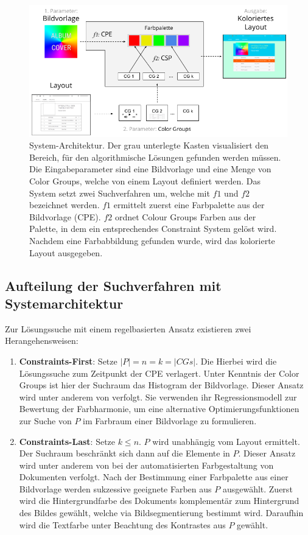 \documentclass[11pt, bibliography=totoc]{scrartcl}
\begin{document}
\begin{figure}
	\centering
	\includegraphics[width=1\textwidth]{img/architecture.png}
	\caption{System-Architektur. Der grau unterlegte Kasten visualisiert den Bereich, für den algorithmische Lösungen gefunden werden müssen. Die Eingabeparameter sind eine Bildvorlage und eine Menge von Color Groups, welche von einem Layout definiert werden. Das System setzt zwei Suchverfahren um, welche mit $f1$ und $f2$ bezeichnet werden. $f1$ ermittelt zuerst eine Farbpalette aus der Bildvorlage (CPE). $f2$ ordnet Colour Groups Farben aus der Palette, in dem ein entsprechendes Constraint System gelöst wird. Nachdem eine Farbabbildung gefunden wurde, wird das kolorierte Layout ausgegeben. }
	\label{fig:architecture}
\end{figure}

\subsection{Aufteilung der Suchverfahren mit Systemarchitektur}

Zur Lösungssuche mit einem regelbasierten Ansatz existieren zwei Herangehensweisen:
\begin{enumerate}
    \item \textbf{Constraints-First}: Setze $|P| = n = k = |CGs|$. Die Hierbei wird die Lösungssuche zum Zeitpunkt der CPE verlagert. Unter Kenntnis der Color Groups ist hier der Suchraum das Histogram der Bildvorlage. Dieser Ansatz wird unter anderem von \citet{colorcomp} verfolgt. Sie verwenden ihr Regressionsmodell zur Bewertung der Farbharmonie, um eine alternative Optimierungsfunktionen zur Suche von $P$ im Farbraum einer Bildvorlage zu formulieren.
    \item \textbf{Constraints-Last}: Setze $k \leq n$. $P$ wird unabhängig vom Layout ermittelt. Der Suchraum beschränkt sich dann auf die Elemente in $P$. Dieser Ansatz wird unter anderem von \citet{documentpalette} bei der automatisierten Farbgestaltung von Dokumenten verfolgt. Nach der Bestimmung einer Farbpalette aus einer Bildvorlage werden sukzessive geeignete Farben aus $P$ ausgewählt. Zuerst wird die Hintergrundfarbe des Dokuments komplementär zum Hintergrund des Bildes gewählt, welche via Bildsegmentierung bestimmt wird. Daraufhin wird die Textfarbe unter Beachtung des Kontrastes aus $P$ gewählt.
\end{enumerate}
\end{document}
